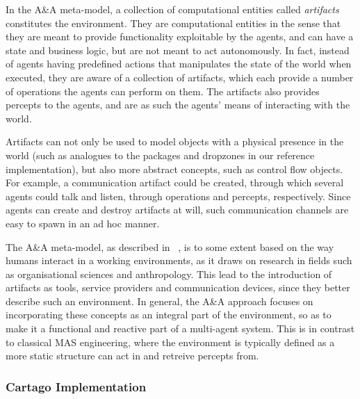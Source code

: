 In the A\&A meta-model, a collection of computational entities called
\emph{artifacts} constitutes the environment. They are computational
entities in the sense that they are meant to provide functionality
exploitable by the agents, and can have a state and business logic,
but are not meant to act autonomously. In fact, instead of agents
having predefined actions that manipulates the state of the world
when executed, they are aware of a collection of artifacts, which
each provide a number of operations the agents can perform on them.
The artifacts also provides percepts to the agents, and are as such
the agents' means of interacting with the world. 

Artifacts can not only be used to model objects with a physical presence
in the world (such as analogues to the packages and dropzones in our
reference implementation), but also more abstract concepts, such as
control flow objects. For example, a communication artifact could
be created, through which several agents could talk and listen, through
operations and percepts, respectively. Since agents can create and
destroy artifacts at will, such communication channels are easy to
spawn in an ad hoc manner.

The A\&A meta-model, as described in ~\cite{Ricci08}, is to some
extent based on the way humans interact in a working environments,
as it draws on research in fields such as organisational sciences
and anthropology. This lead to the introduction of artifacts as tools,
service providers and communication devices, since they better describe
such an environment. In general, the A\&A approach focuses on incorporating
these concepts as an integral part of the environment, so as to make
it a functional and reactive part of a multi-agent system. This is
in contrast to classical MAS engineering, where the environment is
typically defined as a more static structure can act in and retreive
percepts from.


\subsubsection*{Cartago Implementation}

